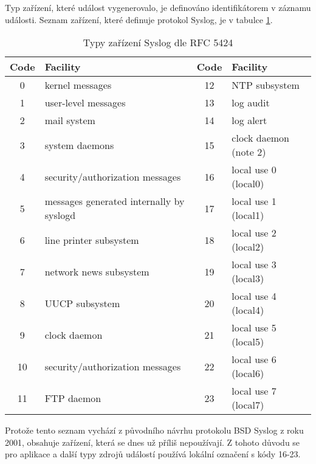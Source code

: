 Typ zařízení, které událost vygenerovalo, je definováno identifikátorem v záznamu události. Seznam zařízení, které definuje protokol Syslog, je v tabulce \ref{tab:facility}. 
\begin{table}[h]
  \centering
  \small
  \begin{tabular}{|c|l|c|l|}
    \hline
    \bf Code & \bf Facility & \bf Code & \bf Facility\\
    \hline
     0  &  kernel messages                             &  12 &  NTP subsystem           \\
     1  &  user-level messages                         &  13 &   log audit              \\
     2  &  mail system                                 &  14 &   log alert              \\
     3  &  system daemons                              &  15 &   clock daemon (note 2)  \\
     4  &  security/authorization messages             &  16 &   local use 0  (local0)  \\
     5  &  messages generated internally by syslogd    &  17 &   local use 1  (local1)  \\
     6  &  line printer subsystem                      &  18 &   local use 2  (local2)  \\
     7  &  network news subsystem                      &  19 &   local use 3  (local3)  \\
     8  &  UUCP subsystem                              &  20 &   local use 4  (local4)  \\
     9  &  clock daemon                                &  21 &   local use 5  (local5)  \\
     10 &  security/authorization messages             &  22 &   local use 6  (local6)  \\
     11 &  FTP daemon                                  &  23 &   local use 7  (local7)  \\
     \hline
  \end{tabular}
  \caption{Typy zařízení Syslog dle RFC 5424 \cite{rfc5424}}\label{tab:facility}
\end{table}
Protože tento seznam vychází z původního  návrhu protokolu BSD Syslog z roku 2001, obsahuje zařízení, která se dnes už příliš nepoužívají. Z tohoto důvodu se pro aplikace a další typy zdrojů událostí používá lokální označení s  kódy 16-23. 

